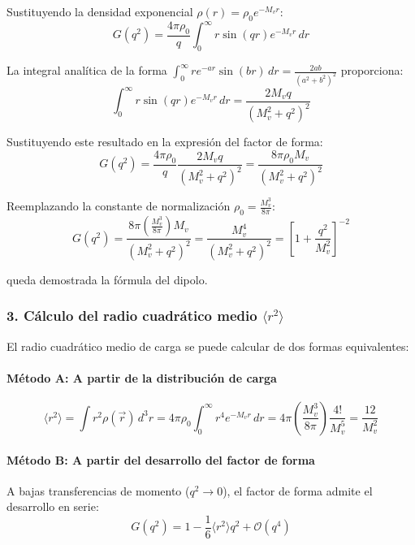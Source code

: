 \begin{problema}
Sustituyendo la densidad exponencial $\rho(r) = \rho_0 e^{-M_v r}$:
\begin{equation}
G(q^2) = \frac{4\pi \rho_0}{q} \int_0^\infty r \sin(qr) e^{-M_v r} \, dr
\end{equation}

La integral analítica de la forma $\int_0^\infty r e^{-a r} \sin(b r) \, dr = \frac{2 a b}{(a^2 + b^2)^2}$ proporciona:
\begin{equation}
\int_0^\infty r \sin(qr) e^{-M_v r} \, dr = \frac{2 M_v q}{(M_v^2 + q^2)^2}
\end{equation}

Sustituyendo este resultado en la expresión del factor de forma:
\begin{equation}
G(q^2) = \frac{4\pi \rho_0}{q} \frac{2 M_v q}{(M_v^2 + q^2)^2} = \frac{8\pi \rho_0 M_v}{(M_v^2 + q^2)^2}
\end{equation}

Reemplazando la constante de normalización $\rho_0 = \frac{M_v^3}{8\pi}$:
\begin{equation}
G(q^2) = \frac{8\pi \left(\frac{M_v^3}{8\pi}\right) M_v}{(M_v^2 + q^2)^2} = \frac{M_v^4}{(M_v^2 + q^2)^2} = \left[ 1 + \frac{q^2}{M_v^2} \right]^{-2}
\end{equation}

queda demostrada la fórmula del dipolo.

\subsubsection*{3. Cálculo del radio cuadrático medio $\langle r^2 \rangle$}

El radio cuadrático medio de carga se puede calcular de dos formas equivalentes:

\paragraph{Método A: A partir de la distribución de carga}
\begin{equation}
\langle r^2 \rangle = \int r^2 \rho(\vec{r}) \, d^3r = 4\pi \rho_0 \int_0^\infty r^4 e^{-M_v r} \, dr = 4\pi \left(\frac{M_v^3}{8\pi}\right) \frac{4!}{M_v^5} = \frac{12}{M_v^2}
\end{equation}

\paragraph{Método B: A partir del desarrollo del factor de forma}
A bajas transferencias de momento ($q^2 \to 0$), el factor de forma admite el desarrollo en serie:
\begin{equation}
G(q^2) = 1 - \frac{1}{6} \langle r^2 \rangle q^2 + \mathcal{O}(q^4)
\end{equation}


\end{problema}
